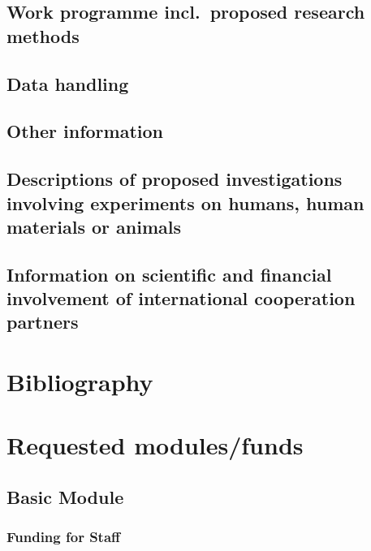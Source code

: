 \documentclass{scrartcl}
\begin{document}
\subsection{Work programme incl.\ proposed research methods}

\subsection{Data handling}

\subsection{Other information}

\subsection{Descriptions of proposed investigations involving experiments on humans, human materials or animals}

\subsection{Information on scientific and financial involvement of international cooperation partners}

\section{Bibliography}

\printbibliography[notcategory=reviewed, notcategory=nonreviewed, notcategory=patents_pending, notcategory=patents, heading=none]


\section{Requested modules/funds}

\subsection{Basic Module}

\subsubsection{Funding for Staff}
\begin{funds}


\end{funds}
\end{document}
